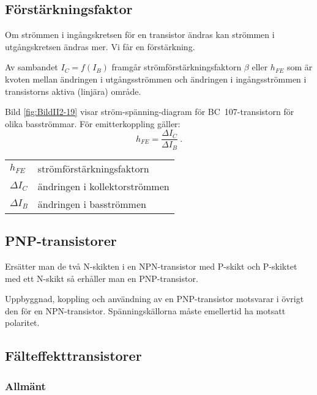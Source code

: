 \subsection{Förstärkningsfaktor}
\label{transistor_förstärkningsfaktor}

Om strömmen i ingångskretsen för en transistor ändras kan strömmen i
utgångskretsen ändras mer.
Vi får en förstärkning.

Av sambandet \(I_C = f(I_B)\) framgår strömförstärkningsfaktorn \(\beta\) eller
\(h_{FE}\) som är kvoten mellan ändringen i utgångsströmmen och ändringen i ingångsströmmen i
transistorns aktiva (linjära) område.

Bild \ref{fig:BildII2-19} visar ström-spänning-diagram för BC~107-transistorn
för olika basströmmar.
För emitterkoppling gäller:
\[h_{FE} = \dfrac{\Delta I_C}{\Delta I_B}~.\]
\begin{tabular}{ll}
  \(h_{FE}\) & strömförstärkningsfaktorn \\
  \(\Delta I_C\)   & ändringen i kollektorströmmen \\
  \(\Delta I_B\)   & ändringen i basströmmen \\
\end{tabular}

\subsection{PNP-transistorer}
\label{transistor_pnp}

Ersätter man de två N-skikten i en NPN-transistor med P-skikt och P-skiktet med
ett N-skikt så erhåller man en PNP-transistor.

Uppbyggnad, koppling och användning av en PNP-transistor motsvarar i övrigt den
för en NPN-transistor. Spänningskällorna måste emellertid ha motsatt polaritet.

\newpage %
\subsection{Fälteffekttransistorer}

\subsubsection{Allmänt}

